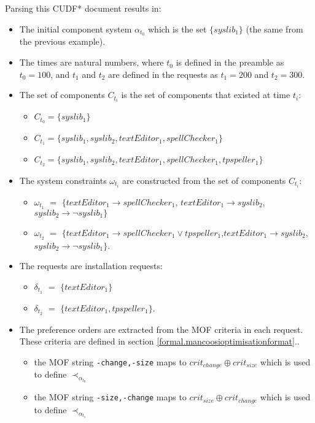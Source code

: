 Parsing this CUDF* document results in:
\begin{itemize}
  \item The initial component system $\alpha_{t_0}$ which is the set $\{syslib_1\}$ (the same from the previous example).
  \item The times are natural numbers, where $t_0$ is defined in the preamble as $t_0 = 100$, and $t_1$ and $t_2$ are defined in the requests as $t_1 = 200$ and $t_2 = 300$.
  \item The set of components $C_{t_i}$ is the set of components that existed at time $t_i$:
\begin{itemize}
  \item $C_{t_0} = \{syslib_1\}$
  \item $C_{t_1} = \{syslib_1, syslib_2, textEditor_1, spellChecker_1\}$
  \item $C_{t_2} = \{syslib_1, syslib_2, textEditor_1, spellChecker_1, tpspeller_1\}$
\end{itemize} 

\item The system constraints $\omega_{t_i}$ are constructed from the set of components $C_{t_i}$:
\begin{itemize}
  \item $\omega_{t_1}$ $=$ $\{ textEditor_1 \rightarrow spellChecker_1$, $textEditor_1 \rightarrow syslib_2$,  $syslib_2 \rightarrow \neg syslib_1\}$
  \item $\omega_{t_2}$ $=$ $\{textEditor_1 \rightarrow spellChecker_1 \vee tpspeller_1$,$textEditor_1 \rightarrow syslib_2$, $syslib_2 \rightarrow \neg syslib_1\}$.
\end{itemize}

\item The requests are installation requests:
\begin{itemize}
  \item $\delta_{t_1}$ $=$  $\{textEditor_1\}$
  \item $\delta_{t_2}$ $=$ $\{textEditor_1, tpspeller_1\}$.
\end{itemize}
\item The preference orders are extracted from the MOF criteria in each request.
These criteria are defined in section \ref{formal.mancoosioptimisationformat}..  
\begin{itemize}
  \item the MOF string \texttt{-change,-size} maps to  $crit_{change} \oplus crit_{size}$ which is used to define $\prec_{\alpha_{t_0}}$
  \item the MOF string \texttt{-size,-change} maps to  $crit_{size} \oplus crit_{change}$ which is used to define $\prec_{\alpha_{t_1}}$
\end{itemize}
\end{itemize}

